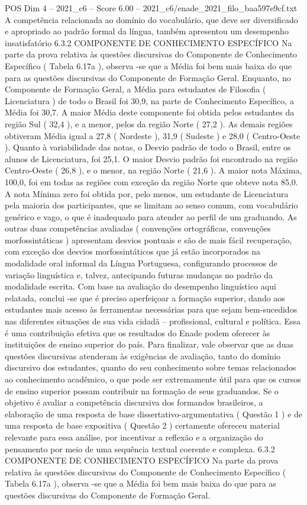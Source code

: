 \begin{textsample}{POS Dim 4 – 2021\_c6 – Score 6.00 – 2021\_c6/enade\_2021\_filo\_baa597e9cf.txt}
A competência relacionada ao domínio do vocabulário, que deve ser diversificado e apropriado ao padrão formal da língua, também apresentou um desempenho insatisfatório 6.3.2 COMPONENTE DE CONHECIMENTO ESPECÍFICO Na parte da prova relativa às questões discursivas do Componente de Conhecimento Específico ( Tabela 6.17a ), observa -se que a Média foi bem mais baixa do que para as questões discursivas do Componente de Formação Geral.
Enquanto, no Componente de Formação Geral, a Média para estudantes de Filosofia ( Licenciatura ) de todo o Brasil foi 30,9, na parte de Conhecimento Específico, a Média foi 30,7.
A maior Média deste componente foi obtida pelos estudantes da região Sul ( 32,4 ), e a menor, pelos da região Norte ( 27,2 ).
As demais regiões obtiveram Média igual a 27,8 ( Nordeste ), 31,9 ( Sudeste ) e 28,0 ( Centro-Oeste ).
Quanto à variabilidade das notas, o Desvio padrão de todo o Brasil, entre os alunos de Licenciatura, foi 25,1.
O maior Desvio padrão foi encontrado na região Centro-Oeste ( 26,8 ), e o menor, na região Norte ( 21,6 ).
A maior nota Máxima, 100,0, foi em todas as regiões com exceção da região Norte que obteve nota 85,0.
A nota Mínima zero foi obtida por, pelo menos, um estudante de Licenciatura pela maioria dos participantes, que se limitam ao senso comum, com vocabulário genérico e vago, o que é inadequado para atender ao perfil de um graduando.
As outras duas competências avaliadas ( convenções ortográficas, convenções morfossintáticas ) apresentam desvios pontuais e são de mais fácil recuperação, com exceção dos desvios morfossintáticos que já estão incorporados na modalidade oral informal da Língua Portuguesa, configurando processos de variação linguística e, talvez, antecipando futuras mudanças no padrão da modalidade escrita.
Com base na avaliação do desempenho linguístico aqui relatada, conclui -se que é preciso aperfeiçoar a formação superior, dando aos estudantes mais acesso às ferramentas necessárias para que sejam bem-sucedidos nas diferentes situações de sua vida cidadã – profissional, cultural e política.
Essa é uma contribuição efetiva que os resultados do Enade podem oferecer às instituições de ensino superior do país.
Para finalizar, vale observar que as duas questões discursivas atenderam às exigências de avaliação, tanto do domínio discursivo dos estudantes, quanto do seu conhecimento sobre temas relacionados ao conhecimento acadêmico, o que pode ser extremamente útil para que os cursos de ensino superior possam contribuir na formação de seus graduandos.
Se o objetivo é avaliar a competência discursiva dos formandos brasileiros, a elaboração de uma resposta de base dissertativo-argumentativa ( Questão 1 ) e de uma resposta de base expositiva ( Questão 2 ) certamente ofereceu material relevante para essa análise, por incentivar a reflexão e a organização do pensamento por meio de uma sequência textual coerente e complexa. 6.3.2 COMPONENTE DE CONHECIMENTO ESPECÍFICO Na parte da prova relativa às questões discursivas do Componente de Conhecimento Específico ( Tabela 6.17a ), observa -se que a Média foi bem mais baixa do que para as questões discursivas do Componente de Formação Geral.

\end{textsample}
